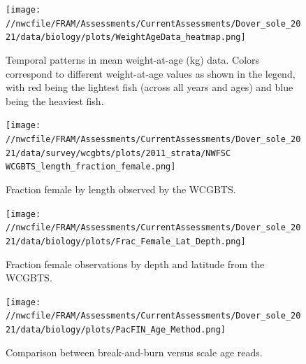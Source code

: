 \documentclass[11pt,
  english,
  a4paper,
]{article}
\begin{document}

\begin{figure}
\centering
\texttt{[image: //nwcfile/FRAM/Assessments/CurrentAssessments/Dover\_sole\_2021/data/biology/plots/WeightAgeData\_heatmap.png]}
\caption{Temporal patterns in mean weight-at-age (kg) data. Colors correspond to different weight-at-age values as shown in the legend, with red being the lightest fish (across all years and ages) and blue being the heaviest fish.\label{fig:tv-wght-at-age}}
\end{figure}

\tagmcend\tagstructend


\begin{figure}
\centering
\texttt{[image: //nwcfile/FRAM/Assessments/CurrentAssessments/Dover\_sole\_2021/data/survey/wcgbts/plots/2011\_strata/NWFSC WCGBTS\_length\_fraction\_female.png]}
\caption{Fraction female by length observed by the WCGBTS.\label{fig:sex-by-len}}
\end{figure}

\tagmcend\tagstructend


\begin{figure}
\centering
\texttt{[image: //nwcfile/FRAM/Assessments/CurrentAssessments/Dover\_sole\_2021/data/biology/plots/Frac\_Female\_Lat\_Depth.png]}
\caption{Fraction female observations by depth and latitude from the WCGBTS.\label{fig:fem-by-lat-depth}}
\end{figure}

\tagmcend\tagstructend


\begin{figure}
\centering
\texttt{[image: //nwcfile/FRAM/Assessments/CurrentAssessments/Dover\_sole\_2021/data/biology/plots/PacFIN\_Age\_Method.png]}
\caption{Comparison between break-and-burn versus scale age reads.\label{fig:scale-age}}
\end{figure}
\end{document}
